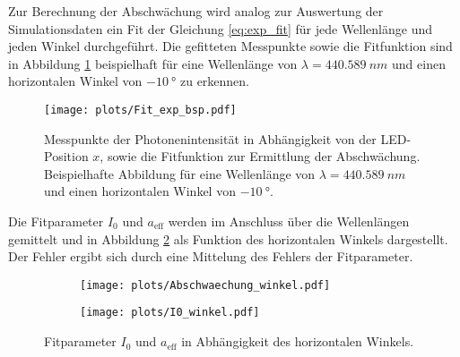 Zur Berechnung der Abschwächung wird analog zur Auswertung der Simulationsdaten ein Fit der Gleichung \eqref{eq:exp_fit} für jede Wellenlänge und jeden Winkel durchgeführt. Die gefitteten Messpunkte sowie die Fitfunktion sind in Abbildung \ref{fig:Fit_exp_bsp} beispielhaft für eine Wellenlänge von $\lambda = \SI{440.589}{nm}$ und einen horizontalen Winkel von $\SI{-10}{°}$ zu erkennen.
\begin{figure}
    \centering
    \texttt{[image: plots/Fit\_exp\_bsp.pdf]}
    \caption{Messpunkte der Photonenintensität in Abhängigkeit von der LED-Position $x$, sowie die Fitfunktion zur Ermittlung der Abschwächung. Beispielhafte Abbildung für eine Wellenlänge von $\lambda = \SI{440.589}{nm}$ und einen horizontalen Winkel von $\SI{-10}{°}$.}
    \label{fig:Fit_exp_bsp}
\end{figure}
\FloatBarrier
Die Fitparameter $I_0$ und $a_\mathrm{eff}$ werden im Anschluss über die Wellenlängen gemittelt und in Abbildung \ref{fig:a_I0_winkel} als Funktion des horizontalen Winkels dargestellt. Der Fehler ergibt sich durch eine Mittelung des Fehlers der Fitparameter.
\begin{figure}
    \begin{subfigure}[c]{0.5\textwidth}    
        \texttt{[image: plots/Abschwaechung\_winkel.pdf]}
    \end{subfigure}
    \begin{subfigure}[c]{0.5\textwidth}
        \texttt{[image: plots/I0\_winkel.pdf]}
    \end{subfigure}
    \caption{Fitparameter $I_0$ und $a_\mathrm{eff}$ in Abhängigkeit des horizontalen Winkels.}
    \label{fig:a_I0_winkel}
\end{figure}

